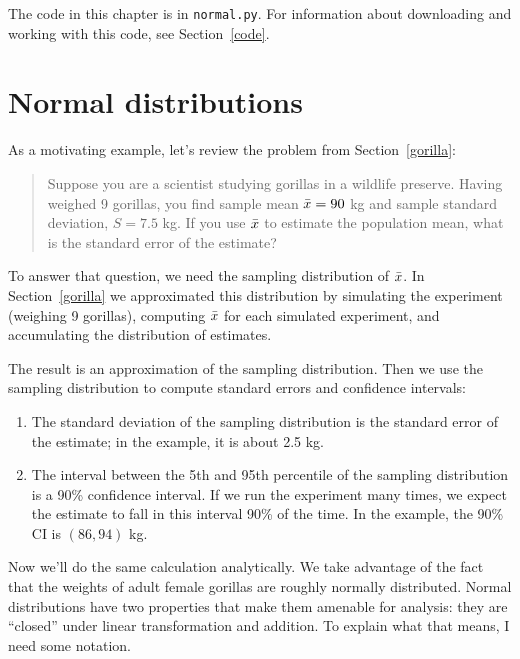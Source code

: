 \documentclass[12pt]{book}
\begin{document}
The code in this chapter is in {\tt normal.py}.  For information
about downloading and working with this code, see Section~\ref{code}.


\section{Normal distributions}
\label{why_normal}

As a motivating example, let's review the problem from
Section~\ref{gorilla}:

\begin{quotation}
\noindent Suppose you are a scientist studying gorillas in a wildlife
preserve.  Having weighed 9 gorillas, you find sample mean $\bar{x}=90$ kg and
sample standard deviation, $S=7.5$ kg.  If you use $\bar{x}$ to estimate
the population mean, what is the standard error of the estimate?
\end{quotation}

To answer that question, we need the sampling
distribution of $\bar{x}$.  In Section~\ref{gorilla} we approximated
this distribution by simulating the experiment (weighing
9 gorillas), computing $\bar{x}$ for each simulated experiment, and
accumulating the distribution of estimates.

The result is an approximation of the sampling distribution.  Then we
use the sampling distribution to compute standard errors and
confidence intervals:

\begin{enumerate}

\item The standard deviation of the sampling distribution is the
  standard error of the estimate; in the example, it is about
  2.5 kg.

\item The interval between the 5th and 95th percentile of the sampling
  distribution is a 90\% confidence interval.  If we run the
  experiment many times, we expect the estimate to fall in this
  interval 90\% of the time.  In the example, the 90\% CI is
  $(86, 94)$ kg.

\end{enumerate}

Now we'll do the same calculation analytically.  We
take advantage of the fact that the weights of adult female gorillas
are roughly normally distributed.  Normal distributions have two
properties that make them amenable for analysis: they are ``closed'' under
linear transformation and addition.  To explain what that means, I
need some notation.  
\end{document}
